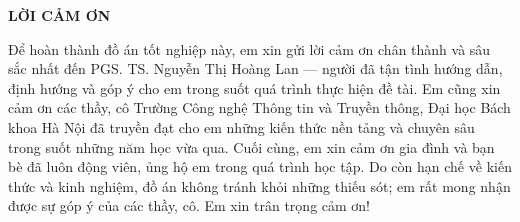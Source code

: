 \documentclass[../DoAn.tex]{subfiles}
\begin{document}
\begin{center}
    \Large{\textbf{LỜI CẢM ƠN}}\\
\end{center}
\vspace{1cm}
Để hoàn thành đồ án tốt nghiệp này, em xin gửi lời cảm ơn chân thành và sâu sắc nhất đến PGS. TS. Nguyễn Thị Hoàng Lan --- người đã tận tình hướng dẫn, định hướng và góp ý cho em trong suốt quá trình thực hiện đề tài. Em cũng xin cảm ơn các thầy, cô Trường Công nghệ Thông tin và Truyền thông, Đại học Bách khoa Hà Nội đã truyền đạt cho em những kiến thức nền tảng và chuyên sâu trong suốt những năm học vừa qua. Cuối cùng, em xin cảm ơn gia đình và bạn bè đã luôn động viên, ủng hộ em trong quá trình học tập. Do còn hạn chế về kiến thức và kinh nghiệm, đồ án không tránh khỏi những thiếu sót; em rất mong nhận được sự góp ý của các thầy, cô. Em xin trân trọng cảm ơn!
\end{document}
